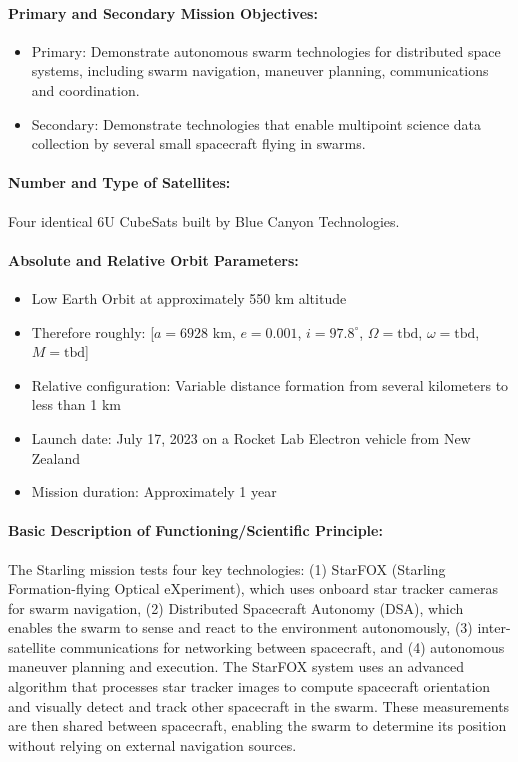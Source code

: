 \paragraph{Primary and Secondary Mission Objectives:}
\begin{itemize}
    \item Primary: Demonstrate autonomous swarm technologies for distributed space systems, including swarm navigation, maneuver planning, communications and coordination.
    \item Secondary: Demonstrate technologies that enable multipoint science data collection by several small spacecraft flying in swarms.
\end{itemize}

\paragraph{Number and Type of Satellites:} 
Four identical 6U CubeSats built by Blue Canyon Technologies.

\paragraph{Absolute and Relative Orbit Parameters:}
\begin{itemize}
    \item Low Earth Orbit at approximately 550 km altitude
    \item Therefore roughly: [$a = 6928$ km, $e = 0.001$, $i = 97.8^{\circ}$, $\Omega = \text{tbd}$, $\omega = \text{tbd}$, $M = \text{tbd}$]
    \item Relative configuration: Variable distance formation from several kilometers to less than 1 km
    \item Launch date: July 17, 2023 on a Rocket Lab Electron vehicle from New Zealand
    \item Mission duration: Approximately 1 year
\end{itemize}

\paragraph{Basic Description of Functioning/Scientific Principle:}
The Starling mission tests four key technologies: (1) StarFOX (Starling Formation-flying Optical eXperiment), which uses onboard star tracker cameras for swarm navigation, (2) Distributed Spacecraft Autonomy (DSA), which enables the swarm to sense and react to the environment autonomously, (3) inter-satellite communications for networking between spacecraft, and (4) autonomous maneuver planning and execution. The StarFOX system uses an advanced algorithm that processes star tracker images to compute spacecraft orientation and visually detect and track other spacecraft in the swarm. These measurements are then shared between spacecraft, enabling the swarm to determine its position without relying on external navigation sources.

